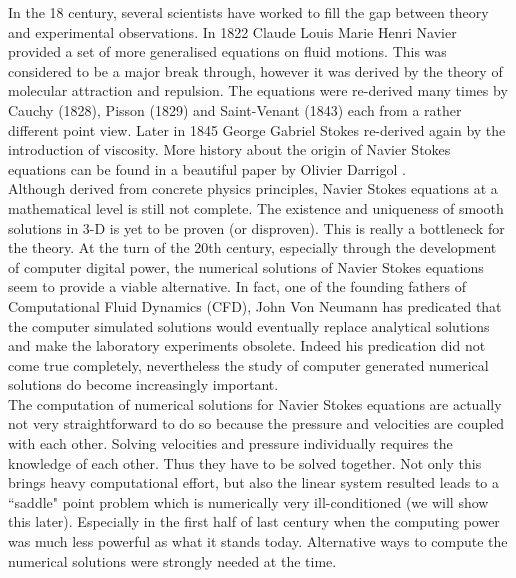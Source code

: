 In the 18 century, several scientists have worked to fill the gap between theory and experimental observations. In 1822 Claude Louis Marie Henri Navier provided a set of more generalised equations on fluid motions. This was considered to be a major break through, however it was derived by the theory of molecular attraction and repulsion. The equations were re-derived many times by Cauchy (1828), Pisson (1829) and Saint-Venant (1843) each from a rather different point view. Later in 1845 George Gabriel Stokes re-derived again by the introduction of viscosity. More history about the origin of Navier Stokes equations can be found in a beautiful paper by Olivier Darrigol \cite{darrigol2002between}.\\

Although derived from concrete physics principles, Navier Stokes equations at a mathematical level is still not complete. The existence and uniqueness of smooth solutions in 3-D is yet to be proven (or disproven). This is really a bottleneck for the theory. At the turn of the 20th century, especially through the development of computer digital power, the numerical solutions of Navier Stokes equations seem to provide a viable alternative. In fact, one of the founding fathers of Computational Fluid Dynamics (CFD), John Von Neumann has predicated that the computer simulated solutions would eventually replace analytical solutions and make the laboratory experiments obsolete. Indeed his predication did not come true completely, nevertheless the study of computer generated numerical solutions do become increasingly important.\\

The computation of numerical solutions for Navier Stokes equations are actually not very straightforward to do so because the pressure and velocities are coupled with each other. Solving velocities and pressure individually requires the knowledge of each other. Thus they have to be solved together. Not only this brings heavy computational effort, but also the linear system resulted leads to a ``saddle" point problem which is numerically very ill-conditioned (we will show this later). Especially in the first half of last century when the computing power was much less powerful as what it stands today. Alternative ways to compute the numerical solutions were strongly needed at the time.\\



